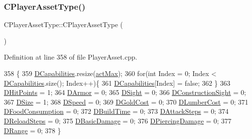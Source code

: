 \subsubsection{\texorpdfstring{C\+Player\+Asset\+Type()}{CPlayerAssetType()}\hspace{0.1cm}{\footnotesize\ttfamily [1/2]}}
{\footnotesize\ttfamily C\+Player\+Asset\+Type\+::\+C\+Player\+Asset\+Type (\begin{DoxyParamCaption}{ }\end{DoxyParamCaption})}



Definition at line 358 of file Player\+Asset.\+cpp.


\begin{DoxyCode}
358                                   \{
359     \hyperlink{classCPlayerAssetType_a243f9161c56446b378dc42b51977fc58}{DCapabilities}.resize(\hyperlink{GameDataTypes_8h_a35b98ce26aca678b03c6f9f76e4778cea77dccd39fc9e5ee854223444006a6f70}{actMax});
360     \textcolor{keywordflow}{for}(\textcolor{keywordtype}{int} Index = 0; Index < \hyperlink{classCPlayerAssetType_a243f9161c56446b378dc42b51977fc58}{DCapabilities}.size(); Index++)\{
361         \hyperlink{classCPlayerAssetType_a243f9161c56446b378dc42b51977fc58}{DCapabilities}[Index] = \textcolor{keyword}{false};
362     \}
363     \hyperlink{classCPlayerAssetType_a0f10bff263838914bf347d9e9bf0af68}{DHitPoints} = 1;
364     \hyperlink{classCPlayerAssetType_ac211254f807a497099509a3e96f7185a}{DArmor} = 0;
365     \hyperlink{classCPlayerAssetType_afa32c3f45737443299a4e681dfe64911}{DSight} = 0;
366     \hyperlink{classCPlayerAssetType_a71b34081d4540087472af3cb9052e04a}{DConstructionSight} = 0;
367     \hyperlink{classCPlayerAssetType_a00e59fe19f83fe37f23341c05010dbc2}{DSize} = 1;
368     \hyperlink{classCPlayerAssetType_a0e72be67119e97fb64a6036cd5da8d1a}{DSpeed} = 0;
369     \hyperlink{classCPlayerAssetType_a2153f3ed158144fc517efd2866de0017}{DGoldCost} = 0;
370     \hyperlink{classCPlayerAssetType_aab2aeb930d654fd5eab51be157b3439f}{DLumberCost} = 0;
371     \hyperlink{classCPlayerAssetType_a8fcab35c2b576476b6f2c80c8b8762fb}{DFoodConsumption} = 0;
372     \hyperlink{classCPlayerAssetType_aa65de0691276352ebc3c3a9936a74278}{DBuildTime} = 0;
373     \hyperlink{classCPlayerAssetType_af2a95fbee4ed2ac1ff1da0f649966a6d}{DAttackSteps} = 0;
374     \hyperlink{classCPlayerAssetType_a192d6ac421608663d18d1a0cda00841e}{DReloadSteps} = 0;
375     \hyperlink{classCPlayerAssetType_ade46bb31e24e01ba4b523bdf67472d59}{DBasicDamage} = 0;
376     \hyperlink{classCPlayerAssetType_af7303175365306fb69e5ff9170b72234}{DPiercingDamage} = 0;
377     \hyperlink{classCPlayerAssetType_a1204a9470d8940fdb81a63670a0f6779}{DRange} = 0;
378 \}
\end{DoxyCode}
\hypertarget{classCPlayerAssetType_af571a936c745e23f1f3c6777af594efe}{}\label{classCPlayerAssetType_af571a936c745e23f1f3c6777af594efe} 
